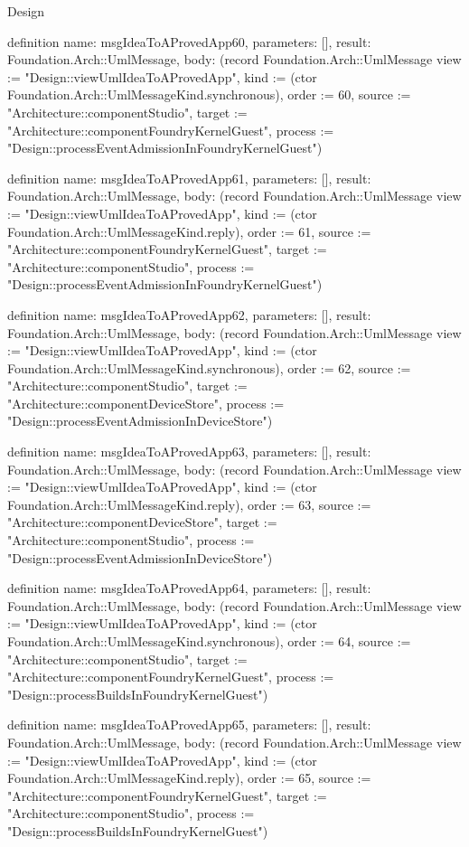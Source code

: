 \begin{lexlean}{Design}
\begin{semanticmodule}
definition{
  name: msgIdeaToAProvedApp60,
  parameters: [],
  result: Foundation.Arch::UmlMessage,
  body: (record Foundation.Arch::UmlMessage {view := "Design::viewUmlIdeaToAProvedApp", kind := (ctor Foundation.Arch::UmlMessageKind.synchronous), order := 60, source := "Architecture::componentStudio", target := "Architecture::componentFoundryKernelGuest", process := "Design::processEventAdmissionInFoundryKernelGuest"})
}

definition{
  name: msgIdeaToAProvedApp61,
  parameters: [],
  result: Foundation.Arch::UmlMessage,
  body: (record Foundation.Arch::UmlMessage {view := "Design::viewUmlIdeaToAProvedApp", kind := (ctor Foundation.Arch::UmlMessageKind.reply), order := 61, source := "Architecture::componentFoundryKernelGuest", target := "Architecture::componentStudio", process := "Design::processEventAdmissionInFoundryKernelGuest"})
}

definition{
  name: msgIdeaToAProvedApp62,
  parameters: [],
  result: Foundation.Arch::UmlMessage,
  body: (record Foundation.Arch::UmlMessage {view := "Design::viewUmlIdeaToAProvedApp", kind := (ctor Foundation.Arch::UmlMessageKind.synchronous), order := 62, source := "Architecture::componentStudio", target := "Architecture::componentDeviceStore", process := "Design::processEventAdmissionInDeviceStore"})
}

definition{
  name: msgIdeaToAProvedApp63,
  parameters: [],
  result: Foundation.Arch::UmlMessage,
  body: (record Foundation.Arch::UmlMessage {view := "Design::viewUmlIdeaToAProvedApp", kind := (ctor Foundation.Arch::UmlMessageKind.reply), order := 63, source := "Architecture::componentDeviceStore", target := "Architecture::componentStudio", process := "Design::processEventAdmissionInDeviceStore"})
}

definition{
  name: msgIdeaToAProvedApp64,
  parameters: [],
  result: Foundation.Arch::UmlMessage,
  body: (record Foundation.Arch::UmlMessage {view := "Design::viewUmlIdeaToAProvedApp", kind := (ctor Foundation.Arch::UmlMessageKind.synchronous), order := 64, source := "Architecture::componentStudio", target := "Architecture::componentFoundryKernelGuest", process := "Design::processBuildsInFoundryKernelGuest"})
}

definition{
  name: msgIdeaToAProvedApp65,
  parameters: [],
  result: Foundation.Arch::UmlMessage,
  body: (record Foundation.Arch::UmlMessage {view := "Design::viewUmlIdeaToAProvedApp", kind := (ctor Foundation.Arch::UmlMessageKind.reply), order := 65, source := "Architecture::componentFoundryKernelGuest", target := "Architecture::componentStudio", process := "Design::processBuildsInFoundryKernelGuest"})
}


\end{semanticmodule}
\end{lexlean}
